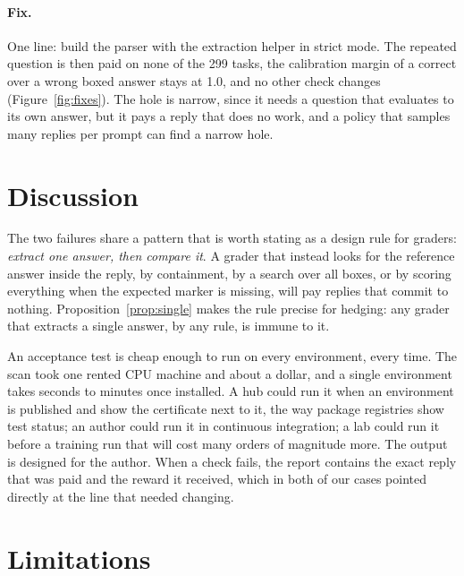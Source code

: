 \paragraph{Fix.} One line: build the parser with the extraction helper in strict mode. The repeated question is then paid on none of the 299 tasks, the calibration margin of a correct over a wrong boxed answer stays at 1.0, and no other check changes (Figure~\ref{fig:fixes}). The hole is narrow, since it needs a question that evaluates to its own answer, but it pays a reply that does no work, and a policy that samples many replies per prompt can find a narrow hole.

\section{Discussion}
\label{sec:discussion}

The two failures share a pattern that is worth stating as a design rule for graders: \emph{extract one answer, then compare it}. A grader that instead looks for the reference answer inside the reply, by containment, by a search over all boxes, or by scoring everything when the expected marker is missing, will pay replies that commit to nothing. Proposition~\ref{prop:single} makes the rule precise for hedging: any grader that extracts a single answer, by any rule, is immune to it.

An acceptance test is cheap enough to run on every environment, every time. The scan took one rented CPU machine and about a dollar, and a single environment takes seconds to minutes once installed. A hub could run it when an environment is published and show the certificate next to it, the way package registries show test status; an author could run it in continuous integration; a lab could run it before a training run that will cost many orders of magnitude more. The output is designed for the author. When a check fails, the report contains the exact reply that was paid and the reward it received, which in both of our cases pointed directly at the line that needed changing.

\section{Limitations}
\label{sec:limitations}

